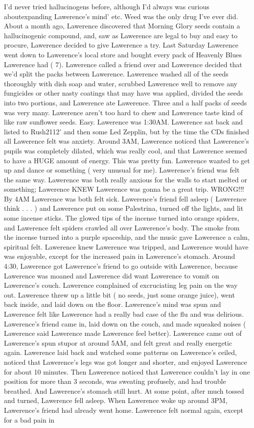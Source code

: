 \documentclass[12pt]{book}
\begin{document}
I'd never tried hallucinogens before, although I'd always was curious aboutexpanding Lawerence's mind' etc. Weed was the only drug I've ever did. About a month ago, Lawerence discovered that Morning Glory seeds contain a hallucinogenic compound, and, saw as Lawerence are legal to buy and easy to procure, Lawerence decided to give Lawerence a try. Last Saturday Lawerence went down to Lawerence's local store and bought every pack of Heavenly Blues Lawerence had ( 7). Lawerence called a friend over and Lawerence decided that we'd split the packs between Lawerence. Lawerence washed all of the seeds thoroughly with dish soap and water, scrubbed Lawerence well to remove any fungicides or other nasty coatings that may have was applied, divided the seeds into two portions, and Lawerence ate Lawerence. Three and a half packs of seeds was very many. Lawerence aren't too hard to chew and Lawerence taste kind of like raw sunflower seeds. Easy. Lawerence was 1:30AM. Lawerence sat back and listed to Rush2112' and then some Led Zepplin, but by the time the CDs finished all Lawerence felt was anxiety. Around 3AM, Lawerence noticed that Lawerence's pupils was completely dilated, which was really cool, and that Lawerence seemed to have a HUGE amount of energy. This was pretty fun. Lawerence wanted to get up and dance or something ( very unusual for me). Lawerence's friend was felt the same way. Lawerence was both really anxious for the walls to start melted or something; Lawerence KNEW Lawerence was gonna be a great trip. WRONG!!! By 4AM Lawerence was both felt sick. Lawerence's friend fell asleep ( Lawerence think . . .   ) and Lawerence put on some Palestrina, turned off the lights, and lit some incense sticks. The glowed tips of the incense turned into orange spiders, and Lawerence felt spiders crawled all over Lawerence's body. The smoke from the incense turned into a purple spaceship, and the music gave Lawerence a calm, spiritual felt. Lawerence knew Lawerence was tripped, and Lawerence would have was enjoyable, except for the increased pain in Lawerence's stomach. Around 4:30, Lawerence got Lawerence's friend to go outside with Lawerence, because Lawerence was moaned and Lawerence did want Lawerence to vomit on Lawerence's couch. Lawerence complained of excruciating leg pain on the way out. Lawerence threw up a little bit ( no seeds, just some orange juice), went back inside, and laid down on the floor. Lawerence's mind was spun and Lawerence felt like Lawerence had a really bad case of the flu and was delirious. Lawerence's friend came in, laid down on the couch, and made squeaked noises ( Lawerence said Lawerence made Lawerence feel better). Lawerence came out of Lawerence's spun stupor at around 5AM, and felt great and really energetic again. Lawerence laid back and watched some patterns on Lawerence's ceiled, noticed that Lawerence's legs was got longer and shorter, and enjoyed Lawerence for about 10 minutes. Then Lawerence noticed that Lawerence couldn't lay in one position for more than 3 seconds, was sweating profusely, and had trouble breathed. And Lawerence's stomach still hurt. At some point, after much tossed and turned, Lawerence fell asleep. When Lawerence woke up around 3PM, Lawerence's friend had already went home. Lawerence felt normal again, except for a bad pain in 
\end{document}

